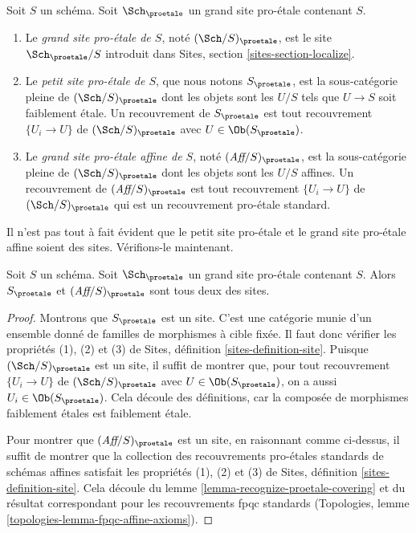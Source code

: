 \begin{definition}
\label{definition-big-small-proetale}
Soit $S$ un schéma. Soit $\Sch_\proetale$ un grand site pro-\'etale
contenant $S$.
\begin{enumerate}
\item Le {\it grand site pro-\'etale de $S$}, noté
$(\Sch/S)_\proetale$, est le site $\Sch_\proetale/S$
introduit dans Sites, section \ref{sites-section-localize}.
\item Le {\it petit site pro-\'etale de $S$}, que nous notons
$S_\proetale$, est la sous-catégorie pleine de $(\Sch/S)_\proetale$
dont les objets sont les $U/S$ tels que $U \to S$ soit faiblement \'etale.
Un recouvrement de $S_\proetale$ est tout recouvrement $\{U_i \to U\}$ de
$(\Sch/S)_\proetale$ avec $U \in \Ob(S_\proetale)$.
\item Le {\it grand site pro-\'etale affine de $S$}, noté
$(\textit{Aff}/S)_\proetale$, est la sous-catégorie pleine de
$(\Sch/S)_\proetale$ dont les objets sont les $U/S$ affines.
Un recouvrement de $(\textit{Aff}/S)_\proetale$ est tout recouvrement
$\{U_i \to U\}$ de $(\Sch/S)_\proetale$ qui est un
recouvrement pro-\'etale standard.
\end{enumerate}
\end{definition}

\noindent
Il n'est pas tout à fait évident que le petit site pro-\'etale et
le grand site pro-\'etale affine soient des sites. Vérifions-le maintenant.

\begin{lemma}
\label{lemma-verify-site-proetale}
Soit $S$ un schéma. Soit $\Sch_\proetale$ un grand site pro-\'etale
contenant $S$. Alors $S_\proetale$ et $(\textit{Aff}/S)_\proetale$ sont tous deux des sites.
\end{lemma}

\begin{proof}
Montrons que $S_\proetale$ est un site. C'est une catégorie munie d'un
ensemble donné de familles de morphismes à cible fixée. Il faut donc
vérifier les propriétés (1), (2) et (3) de
Sites, définition \ref{sites-definition-site}.
Puisque $(\Sch/S)_\proetale$ est un site, il suffit de montrer
que, pour tout recouvrement $\{U_i \to U\}$ de $(\Sch/S)_\proetale$
avec $U \in \Ob(S_\proetale)$, on a aussi $U_i \in \Ob(S_\proetale)$.
Cela découle des définitions,
car la composée de morphismes faiblement \'etales est faiblement \'etale.

\medskip\noindent
Pour montrer que $(\textit{Aff}/S)_\proetale$ est un site, en raisonnant comme ci-dessus,
il suffit de montrer que la collection des recouvrements pro-\'etales standards
de schémas affines satisfait les propriétés (1), (2) et (3) de
Sites, définition \ref{sites-definition-site}.
Cela découle du lemme \ref{lemma-recognize-proetale-covering}
et du résultat correspondant pour les recouvrements fpqc standards
(Topologies, lemme \ref{topologies-lemma-fpqc-affine-axioms}).
\end{proof}

